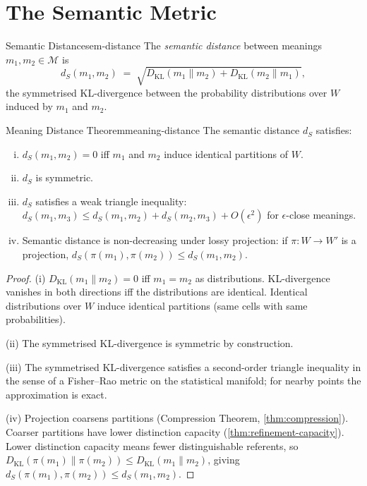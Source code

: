 \documentclass[12pt,twoside,openright]{book}
\begin{document}
\section{The Semantic Metric}

\begin{definition}{Semantic Distance}{sem-distance}
  The \emph{semantic distance} between meanings
  $m_1, m_2 \in \mathcal{M}$ is
  \[
    d_S(m_1, m_2)
    \;=\;
    \sqrt{
      D_\mathrm{KL}(m_1 \| m_2)
      + D_\mathrm{KL}(m_2 \| m_1)
    },
  \]
  the symmetrised KL-divergence between the
  probability distributions over $W$ induced by
  $m_1$ and $m_2$.
\end{definition}

\begin{theorem}{Meaning Distance Theorem}{meaning-distance}
  The semantic distance $d_S$ satisfies:
  \begin{enumerate}[(i)]
    \item $d_S(m_1, m_2) = 0$ iff $m_1$ and $m_2$
          induce identical partitions of $W$.
    \item $d_S$ is symmetric.
    \item $d_S$ satisfies a weak triangle inequality:
          $d_S(m_1, m_3) \le d_S(m_1, m_2)
          + d_S(m_2, m_3) + O(\epsilon^2)$ for
          $\epsilon$-close meanings.
    \item Semantic distance is non-decreasing under
          lossy projection: if $\pi: W \to W'$ is a
          projection, $d_S(\pi(m_1), \pi(m_2))
          \le d_S(m_1, m_2)$.
  \end{enumerate}
\end{theorem}

\begin{proof}
  (i) $D_\mathrm{KL}(m_1 \| m_2) = 0$ iff $m_1 = m_2$
  as distributions. KL-divergence vanishes in both
  directions iff the distributions are identical.
  Identical distributions over $W$ induce identical
  partitions (same cells with same probabilities).

  (ii) The symmetrised KL-divergence is symmetric
  by construction.

  (iii) The symmetrised KL-divergence satisfies a
  second-order triangle inequality in the sense of
  a Fisher--Rao metric on the statistical manifold;
  for nearby points the approximation is exact.

  (iv) Projection coarsens partitions
  (Compression Theorem, \cref{thm:compression}).
  Coarser partitions have lower distinction capacity
  (\cref{thm:refinement-capacity}).
  Lower distinction capacity means fewer
  distinguishable referents, so
  $D_\mathrm{KL}(\pi(m_1) \| \pi(m_2))
  \le D_\mathrm{KL}(m_1 \| m_2)$,
  giving $d_S(\pi(m_1), \pi(m_2)) \le d_S(m_1, m_2)$.
\end{proof}
\end{document}
